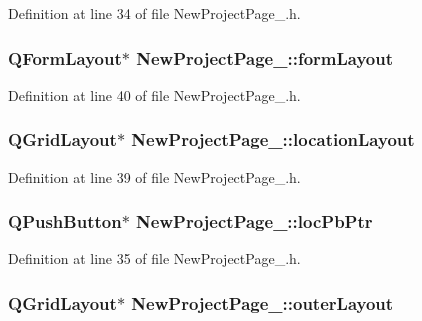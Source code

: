 Definition at line 34 of file New\-Project\-Page\-\_.\-h.

\hypertarget{class_new_project_page__2_afc89c432c8c3cd4740e4a98bbe5f426b}{
\subsubsection[{form\-Layout}]{\setlength{\rightskip}{0pt plus 5cm}Q\-Form\-Layout$\ast$ New\-Project\-Page\-\_\-::form\-Layout\hspace{0.3cm}{\ttfamily [private]}}}\label{class_new_project_page__2_afc89c432c8c3cd4740e4a98bbe5f426b}


Definition at line 40 of file New\-Project\-Page\-\_.\-h.

\hypertarget{class_new_project_page__2_a17fd912b11ae2dad02da7fa3906f948d}{
\subsubsection[{location\-Layout}]{\setlength{\rightskip}{0pt plus 5cm}Q\-Grid\-Layout$\ast$ New\-Project\-Page\-\_\-::location\-Layout\hspace{0.3cm}{\ttfamily [private]}}}\label{class_new_project_page__2_a17fd912b11ae2dad02da7fa3906f948d}


Definition at line 39 of file New\-Project\-Page\-\_.\-h.

\hypertarget{class_new_project_page__2_ab5056e3d84ca52cffb2842c398ee04b2}{
\subsubsection[{loc\-Pb\-Ptr}]{\setlength{\rightskip}{0pt plus 5cm}Q\-Push\-Button$\ast$ New\-Project\-Page\-\_\-::loc\-Pb\-Ptr\hspace{0.3cm}{\ttfamily [private]}}}\label{class_new_project_page__2_ab5056e3d84ca52cffb2842c398ee04b2}


Definition at line 35 of file New\-Project\-Page\-\_.\-h.

\hypertarget{class_new_project_page__2_a59c64379dca8c4bf52e60503b76da65e}{
\subsubsection[{outer\-Layout}]{\setlength{\rightskip}{0pt plus 5cm}Q\-Grid\-Layout$\ast$ New\-Project\-Page\-\_\-::outer\-Layout\hspace{0.3cm}{\ttfamily [private]}}}\label{class_new_project_page__2_a59c64379dca8c4bf52e60503b76da65e}



